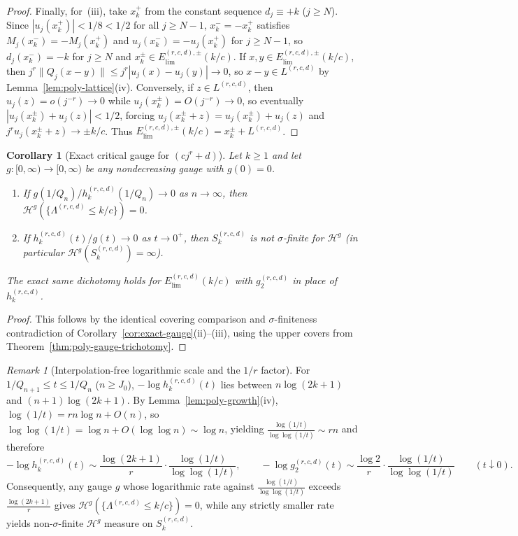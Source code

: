 \documentclass[11pt]{article}
\newtheorem{corollary}[theorem]{Corollary}
\theoremstyle{definition}
\theoremstyle{remark}
\newtheorem{remark}[theorem]{Remark}
\newcommand{\Lam}{\Lambda}
\begin{document}
\begin{proof}
Finally, for~(iii), take $x_k^+$ from the constant sequence $d_j\equiv+k$ ($j\ge N$).
Since $|u_j(x_k^+)|<1/8<1/2$ for all $j\ge N-1$, $x_k^-=-x_k^+$ satisfies
$M_j(x_k^-)=-M_j(x_k^+)$ and $u_j(x_k^-)=-u_j(x_k^+)$ for $j\ge N-1$, so
$d_j(x_k^-)=-k$ for $j\ge N$ and $x_k^\pm\in E_{\mathrm{lim}}^{(r,c,d),\pm}(k/c)$.
If $x,y\in E_{\mathrm{lim}}^{(r,c,d),\pm}(k/c)$, then
$j^r\|Q_j(x-y)\|\le j^r|u_j(x)-u_j(y)|\to0$, so $x-y\in L^{(r,c,d)}$ by
Lemma~\ref{lem:poly-lattice}(iv). Conversely, if $z\in L^{(r,c,d)}$, then
$u_j(z)=o(j^{-r})\to0$ while $u_j(x_k^\pm)=O(j^{-r})\to0$, so eventually
$|u_j(x_k^\pm)+u_j(z)|<1/2$, forcing $u_j(x_k^\pm+z)=u_j(x_k^\pm)+u_j(z)$ and
$j^ru_j(x_k^\pm+z)\to\pm k/c$. Thus $E_{\mathrm{lim}}^{(r,c,d),\pm}(k/c)=x_k^\pm+L^{(r,c,d)}$.
\end{proof}

\begin{corollary}[Exact critical gauge for $(cj^r+d)$]\label{cor:poly-exact-gauge}
Let $k\ge1$ and let $g:[0,\infty)\to[0,\infty)$ be any nondecreasing gauge with $g(0)=0$.
\begin{enumerate}[label=(\roman*),leftmargin=2em]
\item If $g(1/Q_n)/h_k^{(r,c,d)}(1/Q_n)\to0$ as $n\to\infty$, then
$\mathcal H^g(\{\Lam^{(r,c,d)}\le k/c\})=0$.
\item If $h_k^{(r,c,d)}(t)/g(t)\to0$ as $t\to0^+$, then $S_k^{(r,c,d)}$ is not
$\sigma$-finite for $\mathcal H^g$ (in particular $\mathcal H^g(S_k^{(r,c,d)})=\infty$).
\end{enumerate}
The exact same dichotomy holds for $E_{\mathrm{lim}}^{(r,c,d)}(k/c)$ with
$g_2^{(r,c,d)}$ in place of $h_k^{(r,c,d)}$.
\end{corollary}

\begin{proof}
This follows by the identical covering comparison and $\sigma$-finiteness
contradiction of Corollary~\ref{cor:exact-gauge}(ii)--(iii), using the upper
covers from Theorem~\ref{thm:poly-gauge-trichotomy}.
\end{proof}

\begin{remark}[Interpolation-free logarithmic scale and the $1/r$ factor]\label{rem:poly-gauge-scale}
For $1/Q_{n+1}\le t\le 1/Q_n$ ($n\ge J_0$), $-\log h_k^{(r,c,d)}(t)$ lies between
$n\log(2k+1)$ and $(n+1)\log(2k+1)$. By Lemma~\ref{lem:poly-growth}(iv),
$\log(1/t)=rn\log n+O(n)$, so $\log\log(1/t)=\log n+O(\log\log n)\sim\log n$,
yielding $\frac{\log(1/t)}{\log\log(1/t)}\sim rn$ and therefore
\[
-\log h_k^{(r,c,d)}(t)\sim\frac{\log(2k+1)}{r}\cdot\frac{\log(1/t)}{\log\log(1/t)},\qquad
-\log g_2^{(r,c,d)}(t)\sim\frac{\log2}{r}\cdot\frac{\log(1/t)}{\log\log(1/t)}
\qquad(t\downarrow0).
\]
Consequently, any gauge $g$ whose logarithmic rate against
$\frac{\log(1/t)}{\log\log(1/t)}$ exceeds $\frac{\log(2k+1)}{r}$ gives
$\mathcal H^g(\{\Lam^{(r,c,d)}\le k/c\})=0$, while any strictly smaller rate
yields non-$\sigma$-finite $\mathcal H^g$ measure on $S_k^{(r,c,d)}$.
\end{remark}
\end{document}
